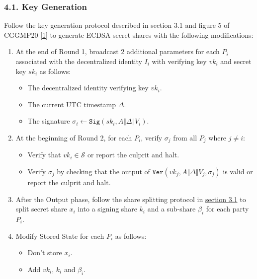 \documentclass[
]{article}
\providecommand{\tightlist}{%
  \setlength{\itemsep}{0pt}\setlength{\parskip}{0pt}}
\begin{document}
\hypertarget{key-generation}{%
\subsubsection{4.1. Key Generation}\label{key-generation}}

Follow the key generation protocol described in section 3.1 and figure 5
of CGGMP20 {[}\protect\hyperlink{ref-cggmp20}{1}{]} to generate ECDSA
secret shares with the following modifications:

\begin{enumerate}
\def\labelenumi{\arabic{enumi}.}
\tightlist
\item
  At the end of Round 1, broadcast 2 additional parameters for each
  \(P_i\) associated with the decentralized identity \(I_i\) with
  verifying key \(vk_i\) and secret key \(sk_i\) as follows:

  \begin{itemize}
  \tightlist
  \item
    The decentralized identity verifying key \(vk_i\).
  \item
    The current UTC timestamp \(\Delta\).
  \item
    The signature
    \(\sigma _i \leftarrow \mathtt{Sig}(sk_i, A \Vert \Delta \Vert V_i)\).
  \end{itemize}
\item
  At the beginning of Round 2, for each \(P_i\), verify \(\sigma _j\)
  from all \(P_j\) where \(j \neq i\):

  \begin{itemize}
  \tightlist
  \item
    Verify that \(vk_i \in \mathcal{S}\) or report the culprit and halt.
  \item
    Verify \(\sigma _j\) by checking that the output of
    \(\mathtt{Ver}(vk_j, A \Vert \Delta \Vert V_j, \sigma _j)\) is valid
    or report the culprit and halt.
  \end{itemize}
\item
  After the Output phase, follow the share splitting protocol in
  \protect\hyperlink{share-splitting}{section 3.1} to split secret share
  \(x_i\) into a signing share \(k_i\) and a sub-share \(\beta _i\) for
  each party \(P_i\).
\item
  Modify Stored State for each \(P_i\) as follows:

  \begin{itemize}
  \tightlist
  \item
    Don't store \(x_i\).
  \item
    Add \(vk_i\), \(k_i\) and \(\beta _i\).
  \end{itemize}
\end{enumerate}
\end{document}
